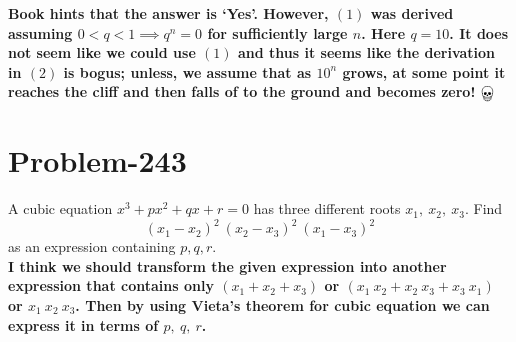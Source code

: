 \documentclass[12pt]{article}
\begin{document}
\textbf{Book hints that the answer is `Yes'. However, $(1)$ was derived assuming $0 < q < 1 \implies q^n = 0$ for sufficiently large $n$. Here $q = 10$. It does not seem like we could use $(1)$ and thus it seems like the derivation in $(2)$ is bogus; unless, we assume that as $10^n$ grows, at some point it reaches the cliff and then falls of to the ground and becomes zero! $\bigskull$}

\section*{Problem-243}
A cubic equation $x^3 + px^2 + qx +r = 0$ has three different roots $x_1,\ x_2,\ x_3$. Find
\[
	(x_1 - x_2)^2\ (x_2 - x_3)^2\ (x_1 - x_3)^2
\]
as an expression containing $p, q, r$.\\

\textbf{I think we should transform the given expression into another expression that contains only $(x_1 + x_2 + x_3)$ or $(x_1\ x_2 + x_2\ x_3 + x_3\ x_1)$ or $x_1\ x_2\ x_3$. Then by using Vieta's theorem for cubic equation we can express it in terms of $p,\ q,\ r$.}
\end{document}
